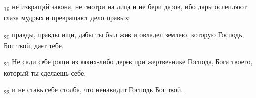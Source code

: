 \begin{tcolorbox}
\textsubscript{19} не извращай закона, не смотри на лица и не бери даров, ибо дары ослепляют глаза мудрых и превращают дело правых;
\end{tcolorbox}
\begin{tcolorbox}
\textsubscript{20} правды, правды ищи, дабы ты был жив и овладел землею, которую Господь, Бог твой, дает тебе.
\end{tcolorbox}
\begin{tcolorbox}
\textsubscript{21} Не сади себе рощи из каких-либо дерев при жертвеннике Господа, Бога твоего, который ты сделаешь себе,
\end{tcolorbox}
\begin{tcolorbox}
\textsubscript{22} и не ставь себе столба, что ненавидит Господь Бог твой.
\end{tcolorbox}
